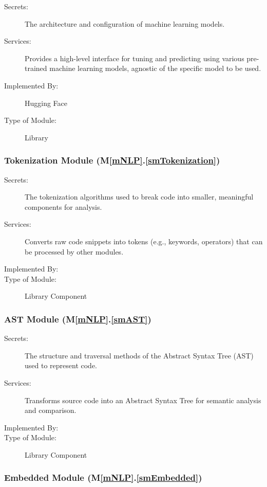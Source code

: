 \documentclass[12pt, titlepage]{article}
\newcommand{\smref}[2]{M\ref{#1}.\ref{#2}}
\begin{document}
\begin{description}
\item[Secrets:] The architecture and configuration of machine learning models.
\item[Services:] Provides a high-level interface for tuning and predicting using various pre-trained machine learning models, agnostic of the specific model to be used.
\item[Implemented By:] Hugging Face
\item[Type of Module:] Library
\end{description}

\subsubsection{Tokenization Module (\smref{mNLP}{smTokenization})}

\begin{description}
\item[Secrets:] The tokenization algorithms used to break code into smaller, meaningful components for analysis.
\item[Services:] Converts raw code snippets into tokens (e.g., keywords, operators) that can be processed by other modules.
\item[Implemented By:] \progname{}
\item[Type of Module:] Library Component
\end{description}

\subsubsection{AST Module (\smref{mNLP}{smAST})}

\begin{description}
\item[Secrets:] The structure and traversal methods of the Abstract Syntax Tree (AST) used to represent code.
\item[Services:] Transforms source code into an Abstract Syntax Tree for semantic analysis and comparison.
\item[Implemented By:] \progname{}
\item[Type of Module:] Library Component
\end{description}

\subsubsection{Embedded Module (\smref{mNLP}{smEmbedded})}
\end{document}

